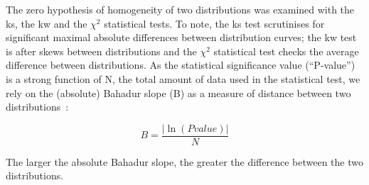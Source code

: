 The zero hypothesis of homogeneity of two distributions was examined with the \gls{ks}, the \gls{kw} and the \({\chi}^{2}\) statistical tests. To note, the \gls{ks} test scrutinises for significant maximal absolute differences between distribution curves; the \gls{kw} test is after skews between distributions and the \({\chi}^{2}\) statistical test checks the average difference between distributions. As the statistical significance value (“P‑value”) is a strong function of N, the total amount of data used in the statistical test, we rely on the (absolute) Bahadur slope (B) as a measure of distance between two distributions~\cite{Bahadur1967, Bahadur1971}:

\begin{equation} \label{eq:bahadur}
B=\frac{|\ln(P value)|}{N}
\end{equation}

The larger the absolute Bahadur slope, the greater the difference between the two distributions.
